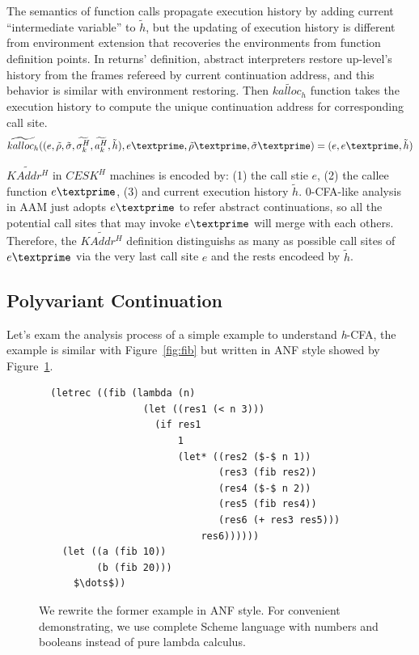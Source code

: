 \documentclass{article}
\begin{document}
The semantics of function calls propagate execution history by adding current ``intermediate variable'' to $\tilde{h}$, but the updating of execution history is different from environment extension that recoveries the environments from function definition points. In returns' definition, abstract interpreters restore up-level's history from the frames refereed by current continuation address, and this behavior is similar with environment restoring. Then $\widetilde{kalloc_h}$ function takes the execution history to compute the unique continuation address for corresponding call site.
\[
\widetilde{kalloc_h} ((e, \tilde{\rho}, \tilde{\sigma}, \widetilde{\sigma_k^H}, \widetilde{a_k^H}, \tilde{h}), e\textprime, \tilde{\rho}\textprime, \tilde{\sigma}\textprime) =
(e, e\textprime, \tilde{h})
\]

$\widetilde{KAddr^H}$ in $CESK^H$ machines is encoded by: (1) the call stie $e$, (2) the callee function $e\textprime$, (3) and current execution history $\tilde{h}$. 0-CFA-like analysis in AAM just adopts $e\textprime$ to refer abstract continuations, so all the potential call sites that may invoke $e\textprime$ will merge with each others. Therefore, the $\widetilde{KAddr^H}$ definition distinguishs as many as possible call sites of $e\textprime$ via the very last call site $e$ and the rests encodeed by $\tilde{h}$.

\subsection{Polyvariant Continuation}
\label{sub:Polyvariant Continuation}
Let's exam the analysis process of a simple example to understand \textit{h}-CFA, the example is similar with Figure~\ref{fig:fib} but written in ANF style showed by Figure~\ref{fig:anf-fib}.

\begin{figure}
\small
{}
\begin{lstlisting}
  (letrec ((fib (lambda (n)
                  (let ((res1 (< n 3)))
                    (if res1
                        1
                        (let* ((res2 ($-$ n 1))
                               (res3 (fib res2))
                               (res4 ($-$ n 2))
                               (res5 (fib res4))
                               (res6 (+ res3 res5)))
                            res6))))))
    (let ((a (fib 10))
          (b (fib 20)))
      $\dots$))
\end{lstlisting}
\caption{
We rewrite the former example in ANF style.
For convenient  demonstrating, we use complete Scheme language with numbers and booleans instead of pure lambda calculus.
}
\label{fig:anf-fib}
\end{figure}
\end{document}
